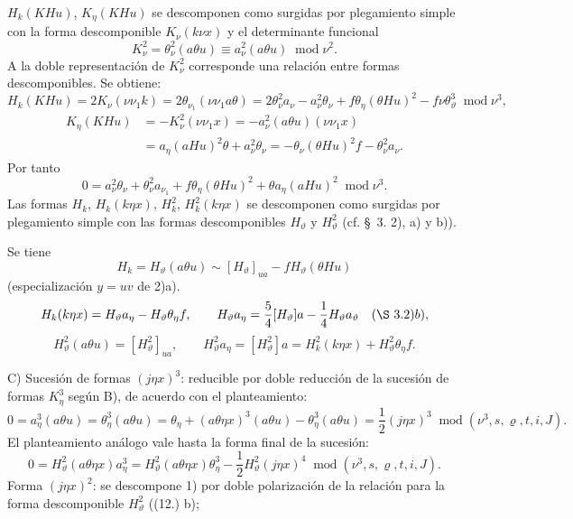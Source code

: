 \documentclass[11pt]{article}
\newcommand{\R}{\varrho}
\newcommand{\modu}[1]{\;\operatorname{mod} #1}
\begin{document}
$H_k(KHu)$, $K_\eta(KHu)$ se descomponen como surgidas por plegamiento simple con la forma descomponible $K_\nu(k\nu x)$ y el determinante funcional
\[
K_\nu^2=\theta_\nu^2(a\theta u)\equiv a_\nu^2(a\theta u)\modu{\nu^2}.
\]
A la doble representación de $K_\nu^2$ corresponde una relación entre formas descomponibles. Se obtiene:
\[
H_k(KHu)=2K_\nu(\nu\nu_1k)=2\theta_{\nu_1}(\nu\nu_1a\theta)
=2\theta_\nu^2a_\nu-a_\nu^2\theta_\nu+f\theta_\eta(\theta Hu)^2-f\nu\theta_\vartheta^3
\modu{\nu^3},
\]
\[
\begin{aligned}
K_\eta(KHu)&=-K_\nu^2(\nu\nu_1x)
=-a_\nu^2(a\theta u)(\nu\nu_1x)\\
&=a_\eta(aHu)^2\theta+a_\nu^2\theta_\nu
=-\theta_\nu(\theta Hu)^2f-\theta_\nu^2a_\nu.
\end{aligned}
\]
Por tanto
\[
\tag{17}
0=a_\nu^2\theta_\nu+\theta_\nu^2a_{\nu_1}+f\theta_\eta(\theta Hu)^2+\theta a_\eta(aHu)^2\modu{\nu^3}.
\]
Las formas $H_k$, $H_k(k\eta x)$, $H_k^2$, $H_k^2(k\eta x)$ se descomponen como surgidas por plegamiento simple con las formas descomponibles $H_\vartheta$ y $H_\vartheta^2$ (cf. \S\ 3. 2), a) y b)).

Se tiene
\[
H_k=H_\vartheta(a\theta u)\sim [H_\vartheta]_{ua}-fH_\vartheta(\theta Hu)
\]
(especialización $y=uv$ de 2)a).
\[
H_k(k\eta x)=H_\vartheta a_\eta-H_\vartheta\theta_\eta f,
\qquad
H_\vartheta a_\eta=\frac54[H_\vartheta]a-\frac14H_\vartheta a_\vartheta
\quad(\S\ 3. 2)b),
\]
\[
H_\vartheta^2(a\theta u)=[H_\vartheta^2]_{ua},
\qquad
H_\vartheta^2a_\eta=[H_\vartheta^2]a=H_k^2(k\eta x)+H_\vartheta^2\theta_\eta f.
\]

\noindent C) Sucesión de formas $(j\eta x)^3$: reducible por doble reducción de la sucesión de formas $K_\eta^3$ según B), de acuerdo con el planteamiento:
\[
0=a_\eta^3(a\theta u)=\theta_\eta^3(a\theta u)
=\theta_\eta+(a\theta\eta x)^3(a\theta u)-\theta_\eta^3(a\theta u)
=\frac12(j\eta x)^3\modu{(\nu^3,s,\R,t,i,J)}.
\]
El planteamiento análogo vale hasta la forma final de la sucesión:
\[
0=H_\vartheta^2(a\theta\eta x)a_\eta^3
=H_\vartheta^2(a\theta\eta x)\theta_\eta^3
-\frac12H_\vartheta^2(j\eta x)^4\modu{(\nu^3,s,\R,t,i,J)}.
\]
Forma $(j\eta x)^2$: se descompone 1) por doble polarización de la relación para la forma descomponible $H_\vartheta^2$ ((12.) b);
\end{document}

